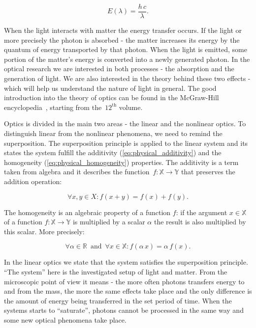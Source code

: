 \documentclass[12pt,twoside,a4paper]{article}
\numberwithin{equation}{subsection}
\numberwithin{figure}{subsection}
\begin{document}
\begin{equation} \label{eq:photon_frequency}
	E(\lambda) = \frac {h\,c} {\lambda}.
\end{equation}

When the light interacts with matter the energy transfer occurs. If the light or more precisely the photon is absorbed - the matter
increases its energy by the quantum of energy transported by that photon. When the light is emitted, some portion of the matter's energy is
converted into a newly generated photon. In the optical research we are interested in both processes - the absorption and the generation of
light. We are also interested in the theory behind these two effects - which will help us understand the nature of light in general. The
good introduction into the theory of optics can be found in the McGraw-Hill encyclopedia~\cite{mcgraw_encyclopedia}, starting from the~$
12^{\text{th}} $ volume.

Optics is divided in the main two areas - the linear and the nonlinear optics. To distinguish linear from the nonlinear phenomena,
we need to remind the superposition. The superposition principle is applied to the linear system and its states the system fulfill the
additivity (\ref{eq:physical_additivity}) and the homogeneity (\ref{eq:physical_homogeneity}) properties. The additivity is a term taken
from algebra and it describes the function~$ f : \mathbb{X} \to \mathbb{Y}$ that preserves the addition operation:

\begin{equation} \label{eq:physical_additivity}
  \forall x, y \in X : f(x + y) = f(x) + f(y) .
\end{equation}

The homogeneity is an algebraic property of a function $f$: if the argument $x \in \mathbb{X} $ of a function $f : \mathbb{X} \to \mathbb{Y}
$ is multiplied by a scalar $ \alpha $ the result is also multiplied by this scalar. More precisely:

\begin{equation} \label{eq:physical_homogeneity}
  \forall \alpha \in \mathbb{R} \, \text{ and } \, \forall x \in \mathbb{X} : f(\alpha \, x) = \alpha \, f(x) .
\end{equation}

In the linear optics we state that the system satisfies the superposition principle. ``The system'' here is the investigated setup of light
and matter. From the microscopic point of view it means - the more often photons transfers energy to and from the mass, the more the same
effects take place and the only difference is the amount of energy being transferred in the set period of time. When the systems starts to
``saturate'', photons cannot be processed in the same way and some new optical phenomena take place.
\end{document}
